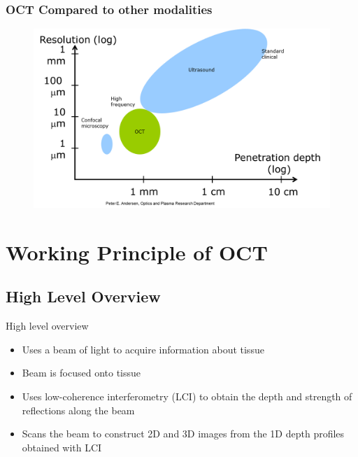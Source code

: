 \begin{frame}
    \frametitle{OCT Compared to other modalities}

    \begin{figure}
        \includegraphics[height=0.8\textheight]{figures/ResolutionComparison.png}
    \end{figure}

\end{frame}


\section{Working Principle of OCT}

\subsection{High Level Overview}%
\label{sub:high_level_overview}


\begin{frame}[c]{High level overview}

    \textbf{\color{faublue}{Optical Coherence Tomography:}}
    \vspace{0.3cm}
    \begin{itemize}
        \setlength\itemsep{0.3cm}
        \item Uses a beam of light to acquire information about tissue
        \item Beam is focused onto tissue
        \item Uses low-coherence interferometry (LCI) to obtain the depth and strength of reflections along the beam
        \item Scans the beam to construct 2D and 3D images from the 1D depth profiles obtained with LCI
    \end{itemize}


\end{frame}


